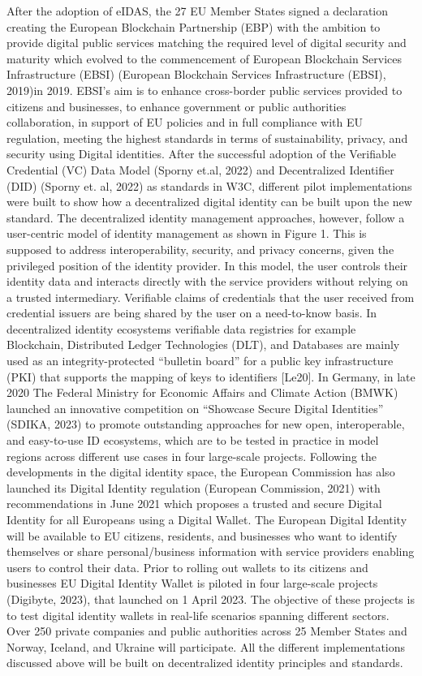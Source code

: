 After the adoption  of eIDAS, the 27 EU Member States signed a declaration creating the European Blockchain Partnership (EBP) with the ambition to provide digital public services matching the required level of digital security and maturity which evolved to the commencement of European Blockchain Services Infrastructure (EBSI) (European Blockchain Services Infrastructure (EBSI), 2019)in 2019. EBSI’s aim is to enhance cross-border public services provided to citizens and businesses, to enhance government or public authorities collaboration, in support of EU policies and in full compliance with EU regulation, meeting the highest standards in terms of sustainability, privacy, and security using Digital identities. After the successful adoption of the Verifiable Credential (VC) Data Model (Sporny et.al, 2022) and Decentralized Identifier (DID) (Sporny et. al, 2022) as standards in W3C, different pilot implementations were built to show how a decentralized digital identity can be built upon the new standard. The decentralized identity management approaches, however, follow a user-centric model of identity management as shown in Figure 1. This is supposed to address interoperability, security, and privacy concerns, given the privileged position of the identity provider. In this model, the user controls their identity data and interacts directly with the service providers without relying on a trusted intermediary. Verifiable claims of credentials that the user received from credential issuers are being shared by the user on a need-to-know basis. In decentralized identity ecosystems verifiable data registries for example Blockchain, Distributed Ledger Technologies (DLT), and Databases are mainly used as an integrity-protected “bulletin board” for a public key infrastructure (PKI) that supports the mapping of keys to identifiers [Le20]. In Germany, in late 2020  The Federal Ministry for Economic Affairs and Climate Action (BMWK) launched an innovative competition on “Showcase Secure Digital Identities” (SDIKA, 2023) to promote outstanding approaches for new open, interoperable, and easy-to-use ID ecosystems, which are to be tested in practice in model regions across different use cases in four large-scale projects. Following the developments in the digital identity space, the European Commission has also launched its Digital Identity regulation (European Commission, 2021) with recommendations in June 2021 which proposes a trusted and secure Digital Identity for all Europeans using a Digital Wallet. The European Digital Identity will be available to EU citizens, residents, and businesses who want to identify themselves or share personal/business information with service providers enabling users to control their data. Prior to rolling out wallets to its citizens and businesses EU Digital Identity Wallet is piloted in four large-scale projects (Digibyte, 2023), that launched on 1 April 2023. The objective of these projects is to test digital identity wallets in real-life scenarios spanning different sectors. Over 250 private companies and public authorities across 25 Member States and Norway, Iceland, and Ukraine will participate. All the different implementations discussed above will be built on decentralized identity principles and standards.


